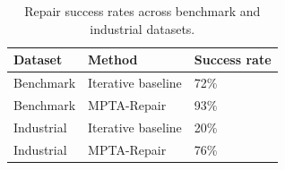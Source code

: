 \begin{table}[t]
\caption{Repair success rates across benchmark and industrial datasets.}
\label{tab:overall-results}
\centering
\scriptsize
\setlength{\tabcolsep}{4pt}
\begin{tabular}{@{}lll@{}}
\toprule
Dataset & Method & Success rate \\
\midrule
Benchmark & Iterative baseline & 72\% \\
Benchmark & MPTA-Repair & 93\% \\
Industrial & Iterative baseline & 20\% \\
Industrial & MPTA-Repair & 76\% \\
\bottomrule
\end{tabular}
\end{table}
